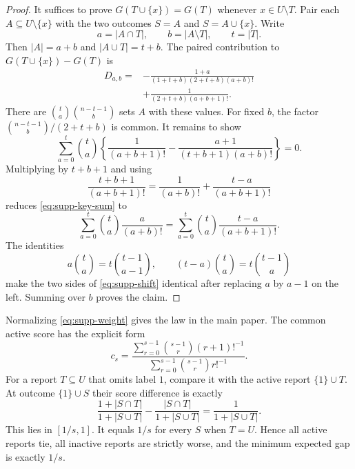 \documentclass[twoside]{article}
\newcommand{\1}{\mathbf 1}
\begin{document}
\begin{proof}
It suffices to prove $G(T\cup\{x\})=G(T)$ whenever $x\in U\setminus T$. Pair each $A\subseteq U\setminus\{x\}$ with the two outcomes $S=A$ and $S=A\cup\{x\}$. Write
\begin{equation}
a=|A\cap T|,
\qquad b=|A\setminus T|,
\qquad t=|T|.
\end{equation}
Then $|A|=a+b$ and $|A\cup T|=t+b$. The paired contribution to $G(T\cup\{x\})-G(T)$ is
\begin{align}
D_{a,b}
={}&-\frac{1+a}{(1+t+b)(2+t+b)(a+b)!}\\
&+\frac1{(2+t+b)(a+b+1)!}.
\label{eq:supp-pair-difference}
\end{align}
There are $\binom{t}{a}\binom{n-t-1}{b}$ sets $A$ with these values. For fixed $b$, the factor $\binom{n-t-1}{b}/(2+t+b)$ is common. It remains to show
\begin{equation}
\sum_{a=0}^t\binom ta
\left\{
\frac1{(a+b+1)!}
-\frac{a+1}{(t+b+1)(a+b)!}
\right\}=0.
\label{eq:supp-key-sum}
\end{equation}
Multiplying by $t+b+1$ and using
\begin{equation}
\frac{t+b+1}{(a+b+1)!}
=\frac1{(a+b)!}+\frac{t-a}{(a+b+1)!}
\end{equation}
reduces \eqref{eq:supp-key-sum} to
\begin{equation}
\sum_{a=0}^t\binom ta\frac{a}{(a+b)!}
=
\sum_{a=0}^t\binom ta\frac{t-a}{(a+b+1)!}.
\label{eq:supp-shift}
\end{equation}
The identities
\begin{equation}
a\binom ta=t\binom{t-1}{a-1},
\qquad
(t-a)\binom ta=t\binom{t-1}{a}
\end{equation}
make the two sides of \eqref{eq:supp-shift} identical after replacing $a$ by $a-1$ on the left. Summing over $b$ proves the claim.
\end{proof}

Normalizing \eqref{eq:supp-weight} gives the law in the main paper. The common active score has the explicit form
\begin{equation}
c_s=
\frac{\displaystyle\sum_{r=0}^{s-1}\binom{s-1}{r}(r+1)!^{-1}}
{\displaystyle\sum_{r=0}^{s-1}\binom{s-1}{r}r!^{-1}}.
\label{eq:supp-common-score}
\end{equation}
For a report $T\subseteq U$ that omits label $1$, compare it with the active report $\{1\}\cup T$. At outcome $\{1\}\cup S$ their score difference is exactly
\begin{equation}
\frac{1+|S\cap T|}{1+|S\cup T|}
-\frac{|S\cap T|}{1+|S\cup T|}
=\frac1{1+|S\cup T|}.
\label{eq:supp-point-gap}
\end{equation}
This lies in $[1/s,1]$. It equals $1/s$ for every $S$ when $T=U$. Hence all active reports tie, all inactive reports are strictly worse, and the minimum expected gap is exactly $1/s$.
\end{document}
